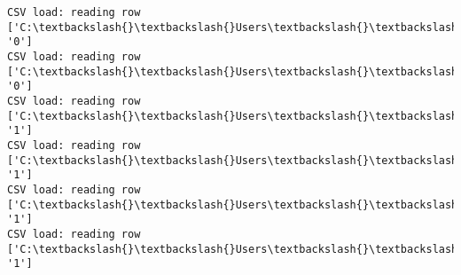 \documentclass[11pt]{article}
\begin{document}
\begin{Verbatim}[commandchars=\\\{\}]
CSV load: reading row ['C:\textbackslash{}\textbackslash{}Users\textbackslash{}\textbackslash{}AbhishekGangadhar\textbackslash{}\textbackslash{}Downloads\textbackslash{}\textbackslash{}ActionRecog\textbackslash{}\textbackslash{}ActionRecog\textbackslash{}\textbackslash{}DataSets\textbackslash{}\textbackslash{}UCF11\textbackslash{}\textbackslash{}action\_youtube\_naudio\textbackslash{}\textbackslash{}biking\textbackslash{}\textbackslash{}v\_biking\_15\textbackslash{}\textbackslash{}v\_biking\_15\_04.avi', '0']
CSV load: reading row ['C:\textbackslash{}\textbackslash{}Users\textbackslash{}\textbackslash{}AbhishekGangadhar\textbackslash{}\textbackslash{}Downloads\textbackslash{}\textbackslash{}ActionRecog\textbackslash{}\textbackslash{}ActionRecog\textbackslash{}\textbackslash{}DataSets\textbackslash{}\textbackslash{}UCF11\textbackslash{}\textbackslash{}action\_youtube\_naudio\textbackslash{}\textbackslash{}biking\textbackslash{}\textbackslash{}v\_biking\_15\textbackslash{}\textbackslash{}v\_biking\_15\_05.avi', '0']
CSV load: reading row ['C:\textbackslash{}\textbackslash{}Users\textbackslash{}\textbackslash{}AbhishekGangadhar\textbackslash{}\textbackslash{}Downloads\textbackslash{}\textbackslash{}ActionRecog\textbackslash{}\textbackslash{}ActionRecog\textbackslash{}\textbackslash{}DataSets\textbackslash{}\textbackslash{}UCF11\textbackslash{}\textbackslash{}action\_youtube\_naudio\textbackslash{}\textbackslash{}golf\_swing\textbackslash{}\textbackslash{}v\_golf\_18\textbackslash{}\textbackslash{}v\_golf\_18\_01.avi', '1']
CSV load: reading row ['C:\textbackslash{}\textbackslash{}Users\textbackslash{}\textbackslash{}AbhishekGangadhar\textbackslash{}\textbackslash{}Downloads\textbackslash{}\textbackslash{}ActionRecog\textbackslash{}\textbackslash{}ActionRecog\textbackslash{}\textbackslash{}DataSets\textbackslash{}\textbackslash{}UCF11\textbackslash{}\textbackslash{}action\_youtube\_naudio\textbackslash{}\textbackslash{}golf\_swing\textbackslash{}\textbackslash{}v\_golf\_18\textbackslash{}\textbackslash{}v\_golf\_18\_02.avi', '1']
CSV load: reading row ['C:\textbackslash{}\textbackslash{}Users\textbackslash{}\textbackslash{}AbhishekGangadhar\textbackslash{}\textbackslash{}Downloads\textbackslash{}\textbackslash{}ActionRecog\textbackslash{}\textbackslash{}ActionRecog\textbackslash{}\textbackslash{}DataSets\textbackslash{}\textbackslash{}UCF11\textbackslash{}\textbackslash{}action\_youtube\_naudio\textbackslash{}\textbackslash{}golf\_swing\textbackslash{}\textbackslash{}v\_golf\_18\textbackslash{}\textbackslash{}v\_golf\_18\_03.avi', '1']
CSV load: reading row ['C:\textbackslash{}\textbackslash{}Users\textbackslash{}\textbackslash{}AbhishekGangadhar\textbackslash{}\textbackslash{}Downloads\textbackslash{}\textbackslash{}ActionRecog\textbackslash{}\textbackslash{}ActionRecog\textbackslash{}\textbackslash{}DataSets\textbackslash{}\textbackslash{}UCF11\textbackslash{}\textbackslash{}action\_youtube\_naudio\textbackslash{}\textbackslash{}golf\_swing\textbackslash{}\textbackslash{}v\_golf\_18\textbackslash{}\textbackslash{}v\_golf\_18\_04.avi', '1']

\end{Verbatim}
\end{document}

